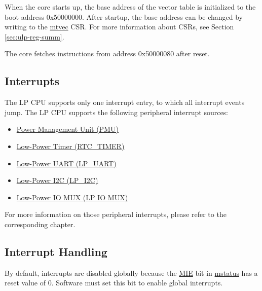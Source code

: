 \documentclass[main\_\_EN.tex]{subfiles}
\begin{document}
When the core starts up, the base address of the vector table is initialized to the boot address 0x50000000. After startup, the base address can be changed by writing to the \hyperref[regdesc:LPMTVEC]{mtvec} CSR. For more information about CSRs, see Section \ref{sec:ulp-reg-summ}.

The core fetches instructions from address 0x50000080 after reset.

\subsection{Interrupts}\label{sec:ulp-intr}

The \chipname{} LP CPU supports only one interrupt entry, to which all interrupt events jump. The LP CPU supports the following peripheral interrupt sources:
\begin{itemize}
    \item \hyperref[mod:lowpowm]{Power Management Unit (PMU)}
    \item \hyperref[mod:lowpowm]{Low-Power Timer (RTC\_TIMER)}
    \item \hyperref[mod:uart]{Low-Power UART (LP\_UART)}
    \item \hyperref[mod:i2c]{Low-Power I2C (LP\_I2C)}
    \item \hyperref[mod:iomuxgpio]{Low-Power IO MUX (LP IO MUX)}
\end{itemize}

For more information on those peripheral interrupts, please refer to the corresponding chapter.

\subsection{Interrupt Handling}

By default, interrupts are disabled globally because the \hyperref[fielddesc:LPMSTATUSMIE]{MIE} bit in \hyperref[regdesc:LPMSTATUS]{mstatus} has a reset value of 0. Software must set this bit to enable global interrupts.
\end{document}
